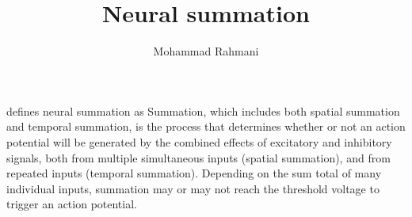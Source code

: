 \documentclass[a4paper]{article}
\title{Neural summation}
\date{}
\author{Mohammad Rahmani}
\begin{document}
\maketitle
     defines neural summation as Summation, which includes both spatial summation and temporal summation, is the process that determines whether or not an action potential will be generated by the combined effects of excitatory and inhibitory signals, both from multiple simultaneous inputs (spatial summation), and from repeated inputs (temporal summation). Depending on the sum total of many individual inputs, summation may or may not reach the threshold voltage to trigger an action potential.
    
    
\end{document}
